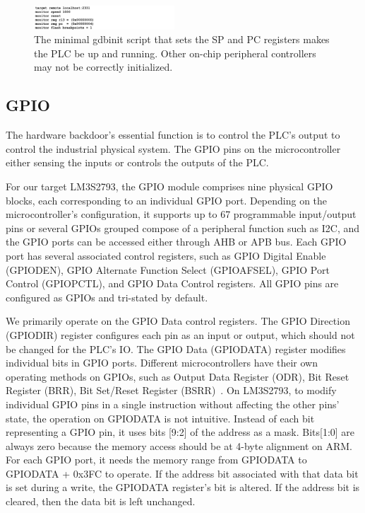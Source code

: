 \begin{figure}[th]
	\includegraphics[width=0.47\textwidth]{figures/gdbinit}
	\centering
	\caption{The minimal gdbinit script that sets the SP and PC registers makes the PLC be up and running. Other on-chip peripheral controllers may not be correctly initialized.}
	\label{fig:gdbinit}
\end{figure}






\subsection{GPIO}

The hardware backdoor's essential function is to control the PLC's output to control the industrial physical system. The GPIO pins on the microcontroller either sensing the inputs or controls the outputs of the PLC.

For our target LM3S2793, the GPIO module comprises nine physical GPIO blocks, each corresponding to an individual GPIO port. Depending on the microcontroller's configuration, it supports up to 67 programmable input/output pins or several GPIOs grouped compose of a peripheral function such as I2C, and the GPIO ports can be accessed either through AHB or APB bus.  Each GPIO port has several associated control registers, such as GPIO Digital Enable (GPIODEN), GPIO Alternate Function Select (GPIOAFSEL), GPIO Port Control (GPIOPCTL), and GPIO Data Control registers. All GPIO pins are configured as GPIOs and tri-stated by default.

We primarily operate on the GPIO Data control registers. The GPIO Direction (GPIODIR) register configures each pin as an input or output, which should not be changed for the PLC's IO. The GPIO Data (GPIODATA) register modifies individual bits in GPIO ports. Different microcontrollers have their own operating methods on GPIOs, such as Output Data Register (ODR), Bit Reset Register (BRR), Bit Set/Reset Register (BSRR)~\cite{cottle2001programmable}. On LM3S2793, to modify individual GPIO pins in a single instruction without affecting the other pins' state, the operation on GPIODATA is not intuitive. Instead of each bit representing a GPIO pin,  it uses bits [9:2] of the address as a mask. Bits[1:0] are always zero because the memory access should be at 4-byte alignment on ARM.  For each GPIO port, it needs the memory range from GPIODATA to GPIODATA + 0x3FC to operate. If the address bit associated with that data bit is set during a write, the GPIODATA register's bit is altered. If the address bit is cleared, then the data bit is left unchanged.

